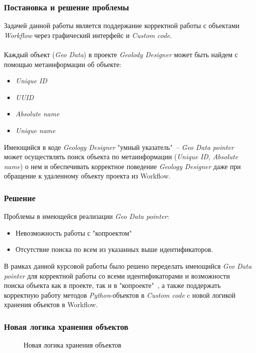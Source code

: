 \documentclass[pdf, 10pt, unicode, aspectratio=169]{beamer} %
\begin{document}
\begin{frame}\frametitle{Постановка и решение проблемы}
Задачей данной работы является поддержание корректной работы с объектами \emph{Workflow} через графический интерфейс и \emph{Custom code}.\\
\, \\
	
Каждый объект (\emph{Geo Data}) в проекте \emph{Geolody Designer} может быть найдем с помощью метаинформации об объекте:
\begin{itemize}
	\item \emph{Unique ID}
	\item \emph{UUID}
	\item \emph{Absolute name}
	\item \emph{Unique name}
\end{itemize}

Имеющийся в коде \emph{Geology Designer} "умный указатель"\ -- \emph{Geo Data pointer} может осуществлять поиск объекта по метаинформации (\emph{Unique ID, Absolute name}) о нем и обеспечивать корректное поведение \emph{Geology Designer} даже при обращение к удаленному объекту проекта из Workflow. 

\end{frame}
\begin{frame}\frametitle{Решение}
Проблемы в имеющейся реализации \emph{Geo Data pointer}:
\begin{itemize}
\item Невозможность работы с "копроектом"\
\item Отсутствие поиска по всем из указанных выше идентификаторов.
\end{itemize} 

В рамках данной курсовой работы было решено переделать имеющийся \emph{Geo Data pointer} для корректной работы со всеми идентификаторами и возможности поиска объекта как в проекте, так и в "копроекте"\ , а также поддержать корректную работу методов \emph{Python}-объектов в \emph{Custom code} c новой логикой хранения объектов в Workflow.\\
\end{frame}
\begin{frame}\frametitle{Новая логика хранения объектов}
\begin{figure}[H]	
	\caption{Новая логика хранения объектов}
\end{figure}
\end{frame}
\end{document}
